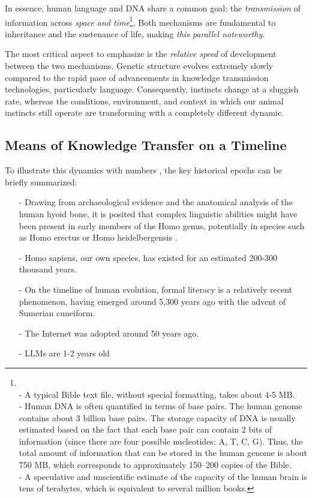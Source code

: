\documentclass[11pt,a4]{article}
\begin{document}
    \par
    In essence, human language and DNA share a common goal: the \textit{transmission} of
    information across \textit{space and time}\footnote{\\- A typical Bible text file,
    without special formatting, takes about 4-5 MB. \\
    - Human DNA is often quantified in terms of base pairs.
    The human genome contains about 3 billion base pairs.
    The storage capacity of DNA is usually estimated based on the
    fact that each base pair can contain
    2 bits of information (since there are four possible nucleotides: A, T, C, G).
    Thus, the total amount of information that can be stored in the human
    genome is about 750 MB, which corresponds to approximately 150–200 copies of
    the Bible.\\
    - A speculative and unscientific estimate of the capacity
    of the human brain is tens of terabytes, which is
    equivalent to several million books.}.
    Both mechanisms are fundamental to inheritance and
    the sustenance of life, making \textit{this parallel noteworthy.}


    The most critical aspect to emphasize is the \textit{relative speed} of
    development between the two mechanisms. Genetic structure evolves extremely
    slowly compared to the rapid pace of advancements in knowledge transmission
    technologies, particularly language. Consequently, instincts change at a
    sluggish rate, whereas the conditions, environment, and context in
    which our animal instincts still operate are transforming with a
    completely different dynamic.
\subsection{Means of Knowledge Transfer on a Timeline}


    To illustrate this dynamics with numbers , the
    key historical epochs can be briefly summarized:

        \begin{itemize}
            \item[-] Drawing from archaeological evidence and the anatomical analysis of the human hyoid bone,
            it is posited that complex linguistic abilities might have been present in early members of the
            Homo genus, potentially in species such as Homo erectus or Homo heidelbergensis \cite{Capasso2008AHE}.
            \item[-] Homo sapiens, our own species, has existed for an estimated 200-300 thousand
            years\cite{Vidal}.
            \item[-] On the timeline of human evolution, formal literacy is a relatively recent
            phenomenon, having emerged around 5,300 years ago with the advent of Sumerian cuneiform\cite{Walker}.
            \item[-] The Internet was adopted around 50 years ago.
            \item[-] LLMs are 1-2 years old
        \end{itemize}
\end{document}
